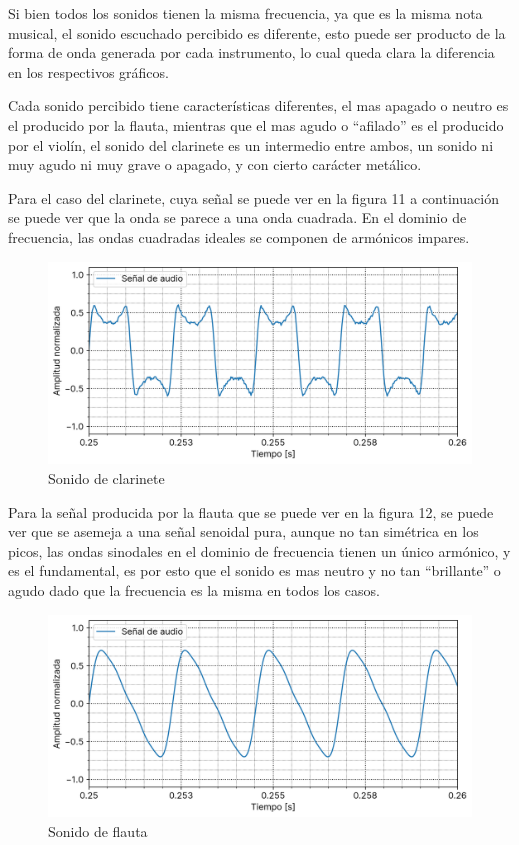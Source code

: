 \documentclass[12pt]{article}
\begin{document}
Si bien todos los sonidos tienen la misma frecuencia, ya que es la misma
nota musical, el sonido escuchado percibido es diferente, esto puede ser
producto de la forma de onda generada por cada instrumento, lo cual
queda clara la diferencia en los respectivos gráficos.

Cada sonido percibido tiene características diferentes, el mas apagado o
neutro es el producido por la flauta, mientras que el mas agudo o
``afilado'' es el producido por el violín, el sonido del clarinete es un
intermedio entre ambos, un sonido ni muy agudo ni muy grave o apagado, y
con cierto carácter metálico.

Para el caso del clarinete, cuya señal se puede ver en la figura 11 a
continuación se puede ver que la onda se parece a una onda cuadrada. En
el dominio de frecuencia, las ondas cuadradas ideales se componen de
armónicos impares.

\begin{figure}
\centering
\includegraphics{plot/a4_clarinete.png}
\caption{Sonido de clarinete}
\label{a4_clarinete}
\end{figure}

Para la señal producida por la flauta que se puede ver en la figura 12,
se puede ver que se asemeja a una señal senoidal pura, aunque no tan
simétrica en los picos, las ondas sinodales en el dominio de frecuencia
tienen un único armónico, y es el fundamental, es por esto que el sonido
es mas neutro y no tan ``brillante'' o agudo dado que la frecuencia es
la misma en todos los casos.

\begin{figure}
\centering
\includegraphics{plot/a4_flauta.png}
\caption{Sonido de flauta}
\label{a4_flauta}
\end{figure}
\end{document}
